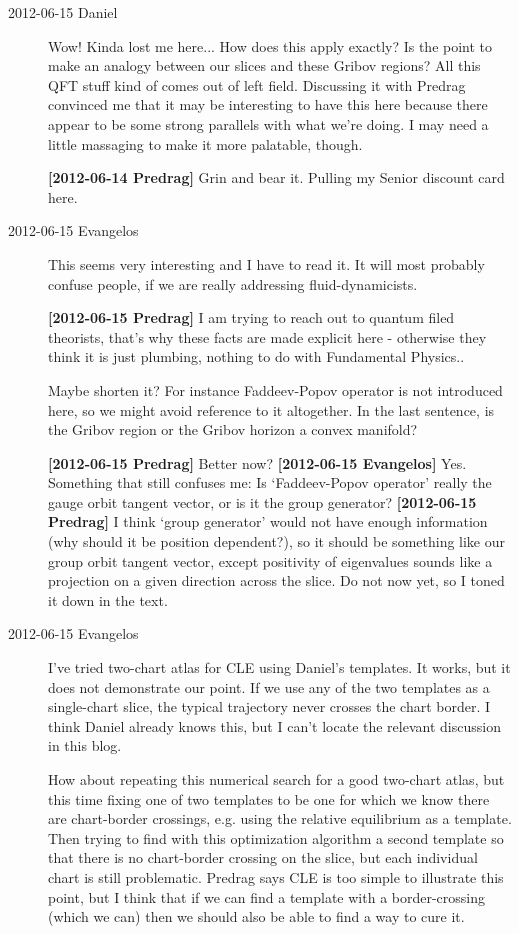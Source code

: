 \begin{description}
\item[2012-06-15 Daniel]
Wow! Kinda lost me here... How does this apply exactly? Is the
point to make an analogy between our slices and these Gribov regions?
All this QFT stuff kind of comes out of left field. Discussing
it with Predrag convinced me that it may be interesting to have this here
because there appear to be some strong parallels with what we're doing. I
may need a little massaging to make it more palatable, though.

{\bf [2012-06-14 Predrag]} Grin and bear it. Pulling my Senior discount
card here.

\item[2012-06-15 Evangelos]
This seems very interesting and I have to read it. It will most probably
confuse people, if we are really addressing fluid-dynamicists.

{\bf [2012-06-15 Predrag]} I am trying to reach out to quantum filed
theorists, that's why these facts are made explicit here - otherwise they
think it is just plumbing, nothing to do with Fundamental Physics..

Maybe shorten it? For instance Faddeev-Popov operator is not introduced
here, so we might avoid reference to it altogether. In the last sentence,
is the Gribov region or the Gribov horizon a convex manifold?

{\bf [2012-06-15 Predrag]} Better now? {\bf [2012-06-15 Evangelos]}  Yes.
Something that still confuses me: Is `Faddeev-Popov operator' really the
gauge orbit tangent vector, or is it the group generator? {\bf
[2012-06-15 Predrag]} I think `group generator' would not have enough
information (why should it be position dependent?), so it should be
something like our group orbit tangent vector, except positivity of
eigenvalues sounds like a projection on a given direction across the
slice. Do not now yet, so I toned it down in the text.

\item[2012-06-15 Evangelos]
I've tried two-chart atlas for CLE using Daniel's
templates. It works, but it does not demonstrate our point. If we use any of the
two templates as a single-chart slice, the typical trajectory never crosses the
chart border. I think Daniel already knows this, but I can't locate the
relevant discussion in this blog.

How about repeating this numerical search for a good two-chart atlas, but this
time fixing one of two templates to be one for which we know there are
chart-border crossings, e.g. using the relative equilibrium as a template.
Then trying to find with this optimization algorithm a second template
so that there is no chart-border crossing on the slice, but each individual
chart is still problematic. Predrag says CLE is too simple to illustrate this
point, but I think that if we can find a template with a border-crossing (which
we can) then we should also be able to find a way to cure it.


\end{description}
